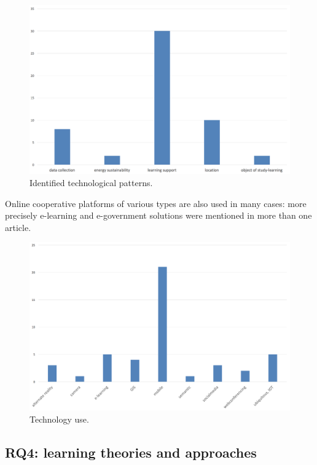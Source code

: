 \begin{figure}[htb]
\centering
\includegraphics[width=12cm]{img/technological_pattern}
\caption{Identified technological patterns.}
\label{fig:tech_patterns}
\end{figure}

Online cooperative platforms of various types are also used in many cases: more precisely e-learning\cite{schneider_location_2007}\cite{kabaka_elearning_2013} and e-government solutions\cite{wong_prototype_2005}\cite{deakin_intelligent_2012} were mentioned in more than one article.

\begin{figure}[htb]
\centering
\includegraphics[width=12cm]{img/technology}
\caption{Technology use.}
\label{fig:technology}
\end{figure}


\subsection*{RQ4: learning theories and approaches}

